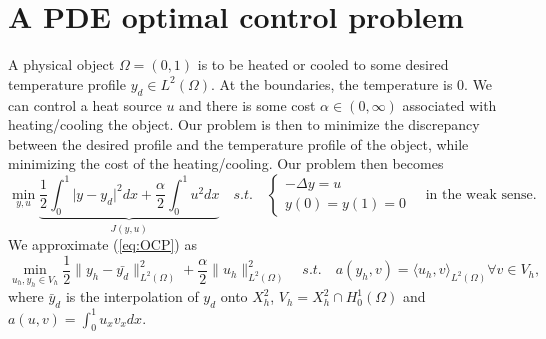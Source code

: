 \section{A PDE optimal control problem}
A physical object $\Omega = (0, 1)$ is to be heated or cooled to some desired temperature profile $y_d \in L^2 (\Omega)$. At the boundaries, the temperature is $0$. 
We can control a heat source $u$ and there is some cost $\alpha \in (0, \infty)$ associated with heating/cooling the object.
Our problem is then to minimize the discrepancy between the desired profile and the temperature profile of the object, while minimizing the cost of the heating/cooling.
Our problem then becomes
\begin{equation}
    \label{eq:OCP}
    \min_{y, u} \underbrace{\frac{1}{2} \int_0^1 \lvert y - y_d \rvert^2 dx + \frac{\alpha}{2}\int_0^1u^2 dx}_{J(y, u)}
    \quad s.t. \quad \begin{cases}
       -\Delta y = u \\
       y(0) = y(1) = 0
    \end{cases} 
    \quad \text{in the weak sense.}
\end{equation}
We approximate (\ref{eq:OCP}) as 
\begin{equation}
    \label{eq:OCP_FE}
    \min_{u_h, y_h \in V_h} \frac{1}{2} \lVert y_h - \bar{y_d} \rVert_ {L^2(\Omega)}^2 + \frac{\alpha}{2} \lVert u_h \rVert_{L^2(\Omega)}^2
    \quad s.t. \quad a(y_h, v) = \langle u_h, v \rangle_{L^2(\Omega)} \forall v \in V_h,
\end{equation}
where $\bar{y}_d$ is the interpolation of $y_d$ onto $X_h^2$, $V_h = X_h^2 \cap H_0^1 (\Omega)$ and $a(u, v) = \int_0^1 u_x v_x dx$.
